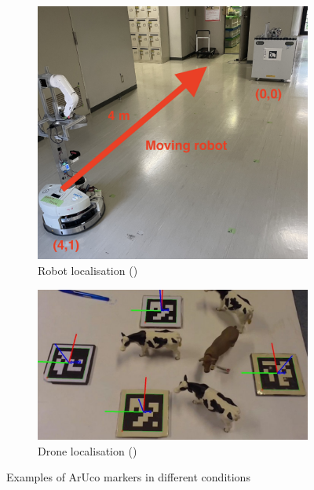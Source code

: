 \documentclass[conference]{IEEEtran}
\begin{document}
\begin{figure}[h]
    \centering
    \begin{subfigure}[b]{0.45\textwidth}
        \centering
        \includegraphics[width=\textwidth]{images/aruco-example-1.png}
        \caption{Robot localisation (\cite{AI-Assisted-Drone-Localization})}
        \label{fig:aruco1}
    \end{subfigure}
    \hfill
    \begin{subfigure}[b]{0.45\textwidth}
        \centering
        \includegraphics[width=\textwidth]{images/aruco-example-2.png}
        \caption{Drone localisation (\cite{Nakajima2024AboutAE})}
        \label{fig:aruco2}
    \end{subfigure}
    \caption{Examples of ArUco markers in different conditions}
    \label{fig:aruco_markers}
\end{figure}
\end{document}
